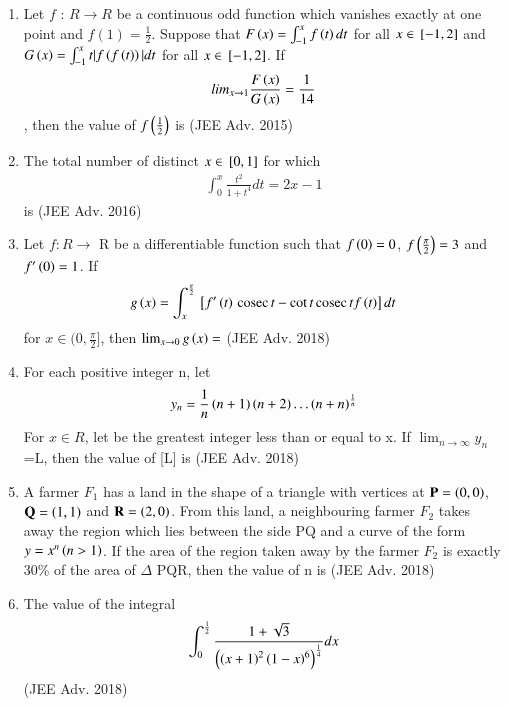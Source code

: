\documentclass[journal,12pt,onecolumn]{IEEEtran}
\theoremstyle{remark}
\begin{document}
\begin{enumerate}
\item Let $f$ : $R \rightarrow R$ be a continuous odd function which vanishes exactly at one point and $f(1)=\frac{1}{2}$. Suppose that $F\left(x\right)=\int_{-1}^{x}f\left(t\right)dt$ for all $x\in{}\left[-1,2\right]$ and $G\left(x\right)=\int_{-1}^{x}t|f\left(f\left(t\right)\right)|dt$ for all $x\in {}\left[-1,2\right]$. If 
	\begin{align}
		lim_{x\to 1} \frac{F\left(x\right)}{G\left(x\right)}=\frac{1}{14}
	\end{align}
		, then the value of $f\left(\frac{1}{2}\right)$ is  \hfill{(JEE Adv. 2015)}

\item The total number of distinct $x\in{}\left[0,1\right]$ for which 
	\begin{align}
		\int_{0}^{x}\frac{t^2}{1+t^4}dt=2x-1
	\end{align} is \hfill{(JEE Adv. 2016)}

\item Let $f:R\rightarrow$ R be a differentiable function such that $f\left(0\right)=0$, $f\left(\frac{\pi}{2}\right)=3$ and $f^\prime\left(0\right)=1$. If 
	\begin{align}
		g\left(x\right)=\int_{x}^{\frac{\pi}{2}}{}\left[f^\prime\left(t\right)\,\text{cosec}\, t -\cot t\,\text{cosec}\, tf\left(t\right)\right]dt
	\end{align}
		for $x\in \bigg(0,\frac{\pi}{2}\biggr]$, then $\lim_{x\to 0} g\left(x\right)= $   \hfill{(JEE Adv. 2018)}

\item For each positive integer n, let 
	\begin{align}
		y_n =\frac{1}{n}\left(n+1\right)\left(n+2\right)\dots\left(n+n\right)^{\frac{1}{n}}
	\end{align}
		For $x \in R$, let  be the greatest integer less than  or equal to x. If $\lim_{n\to \infty} y_n$=L, then the value of [L] is \hfill{(JEE Adv. 2018)}

\item A farmer $F_1$ has a land in the shape of a triangle with vertices at $\mathbf{P}=\left(0,0\right)$,$\mathbf{Q}=\left(1,1\right)$ and $\mathbf{R}=\left(2,0\right)$. From this land, a neighbouring farmer $F_2$ takes away the region which lies between the side PQ and a curve of the form $y=x^n\left(n>1\right)$. If the area of the region taken away by the farmer $F_2$ is exactly 30\% of the area of $\Delta$ PQR, then the value of n is \hfill{(JEE Adv. 2018)} 

\item The value of the integral \begin{align}
		\int_{0}^{\frac{1}{2}}\frac{1+\sqrt{3}}{\left(\left(x+1\right)^2\left(1-x\right)^6\right)^\frac{1}{4}}dx
\end{align} \hfill{(JEE Adv. 2018)}


\end{enumerate}
\end{document}

